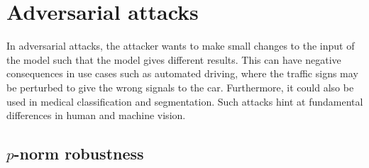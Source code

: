 \section{Adversarial attacks}

In adversarial attacks, the attacker wants to make small changes to the input of the model such
that the model gives different results. This can have negative consequences in use cases such as
automated driving, where the traffic signs may be perturbed to give the wrong signals to the car.
Furthermore, it could also be used in medical classification and segmentation. Such attacks hint at
fundamental differences in human and machine vision.

\subsection{$p$-norm robustness}

